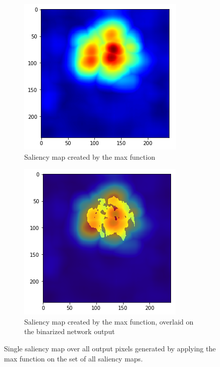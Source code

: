 \begin{figure}[H]
    \centering
    \begin{subfigure}[t]{.4\textwidth}
        \centering
        \includegraphics[width=\linewidth]{chapters/04_segmentation/images/rise_multipixel_max_1-0.png}
        \caption{Saliency map created by the max function}
    \end{subfigure}\hspace{1cm}%
    \begin{subfigure}[t]{.4\textwidth}
        \centering
        \includegraphics[width=\linewidth]{chapters/04_segmentation/images/rise_multipixel_max_1-1.png}
        \caption{Saliency map created by the max function, overlaid on the binarized network output}
    \end{subfigure}
    \caption{Single saliency map over all output pixels generated by applying the max function on the set of all saliency maps.}
    \label{rise_multipixel_max}
\end{figure}

